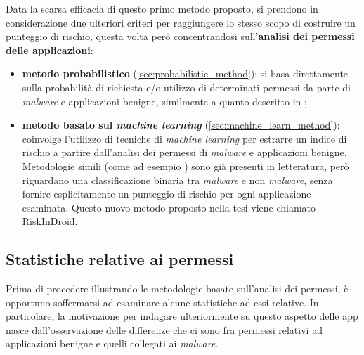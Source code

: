 \documentclass[12pt,a4paper,oneside]{article}
\begin{document}
Data la scarsa efficacia di questo primo metodo proposto, si prendono in considerazione due ulteriori criteri per raggiungere lo stesso scopo di costruire un punteggio di rischio, questa volta però concentrandosi sull'\textbf{analisi dei permessi delle applicazioni}:

\begin{itemize}
    \item\textbf{metodo probabilistico} (\cref{sec:probabilistic_method}): si basa direttamente sulla probabilità di richiesta e/o utilizzo di determinati permessi da parte di \textit{malware} e applicazioni benigne, similmente a quanto descritto in \cite{WANG_QUANTITATIVE};
    \item\textbf{metodo basato sul \textit{machine learning}} (\cref{sec:machine_learn_method}): coinvolge l'utilizzo di tecniche di \textit{machine learning} per estrarre un indice di rischio a partire dall'analisi dei permessi di \textit{malware} e applicazioni benigne. Metodologie simili (come ad esempio \cite{DREBIN_DATASET}) sono già presenti in letteratura, però riguardano una classificazione binaria tra \textit{malware} e non \textit{malware}, senza fornire esplicitamente un punteggio di rischio per ogni applicazione esaminata. Questo nuovo metodo proposto nella tesi viene chiamato RiskInDroid.
\end{itemize}



\subsection{Statistiche relative ai permessi}\label{sec:statistiche_permessi}

Prima di procedere illustrando le metodologie basate sull'analisi dei permessi, è opportuno soffermarsi ad esaminare alcune statistiche ad essi relative. In particolare, la motivazione per indagare ulteriormente su questo aspetto delle app nasce dall'osservazione delle differenze che ci sono fra permessi relativi ad applicazioni benigne e quelli collegati ai \textit{malware}.
\end{document}
